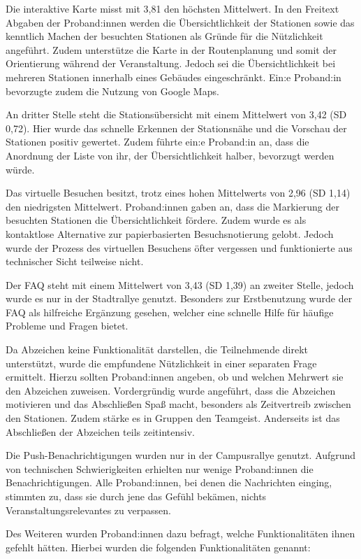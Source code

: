 Die interaktive Karte misst mit 3,81 den höchsten Mittelwert. In den Freitext
Abgaben der Proband:innen werden die Übersichtlichkeit der Stationen sowie das
kenntlich Machen der besuchten Stationen als Gründe für die Nützlichkeit
angeführt. Zudem unterstütze die Karte in der Routenplanung und somit der
Orientierung während der Veranstaltung. Jedoch sei die Übersichtlichkeit bei
mehreren Stationen innerhalb eines Gebäudes eingeschränkt. Ein:e Proband:in
bevorzugte zudem die Nutzung von Google Maps.

An dritter Stelle steht die Stationsübersicht mit einem Mittelwert von 3,42 (SD
0,72). Hier wurde das schnelle Erkennen der Stationsnähe und die Vorschau der
Stationen positiv gewertet. Zudem führte ein:e Proband:in an, dass die Anordnung
der Liste von ihr, der Übersichtlichkeit halber, bevorzugt werden würde.

Das virtuelle Besuchen besitzt, trotz eines hohen Mittelwerts von 2,96 (SD 1,14)
den niedrigsten Mittelwert. Proband:innen gaben an, dass die Markierung der
besuchten Stationen die Übersichtlichkeit fördere. Zudem wurde es als
kontaktlose Alternative zur papierbasierten Besuchsnotierung gelobt. Jedoch
wurde der Prozess des virtuellen Besuchens öfter vergessen und funktionierte aus
technischer Sicht teilweise nicht.

Der FAQ steht mit einem Mittelwert von 3,43 (SD 1,39) an zweiter Stelle, jedoch
wurde es nur in der Stadtrallye genutzt. Besonders zur Erstbenutzung wurde der FAQ als hilfreiche Ergänzung gesehen, welcher eine schnelle Hilfe für häufige
Probleme und Fragen bietet.

Da Abzeichen keine Funktionalität darstellen, die Teilnehmende direkt
unterstützt, wurde die empfundene Nützlichkeit in einer separaten Frage
ermittelt. Hierzu sollten Proband:innen angeben, ob und welchen Mehrwert sie den
Abzeichen zuweisen. Vordergründig wurde angeführt, dass die Abzeichen motivieren
und das Abschließen Spaß macht, besonders als Zeitvertreib zwischen den
Stationen. Zudem stärke es in Gruppen den Teamgeist. Anderseits ist das
Abschließen der Abzeichen teils zeitintensiv.

Die Push-Benachrichtigungen wurden nur in der Campusrallye genutzt. Aufgrund von
technischen Schwierigkeiten erhielten nur wenige Proband:innen die
Benachrichtigungen. Alle Proband:innen, bei denen die Nachrichten einging,
stimmten zu, dass sie durch jene das Gefühl bekämen, nichts
Veranstaltungsrelevantes zu verpassen.

Des Weiteren wurden Proband:innen dazu befragt, welche
Funktionalitäten ihnen gefehlt hätten. Hierbei wurden die folgenden
Funktionalitäten genannt:

